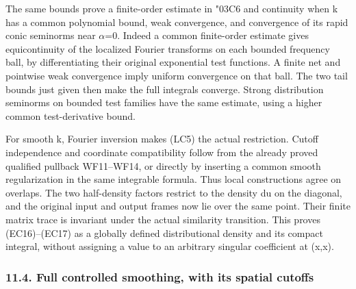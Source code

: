 \documentclass[
  11pt,
]{article}
\begin{document}
The same bounds prove a finite-order estimate in {\ReaderSymbols\char"03C6} and continuity when k
has a common polynomial bound, weak convergence, and convergence of its
rapid conic seminorms near \ensuremath{\alpha}=0. Indeed a common finite-order estimate
gives equicontinuity of the localized Fourier transforms on each bounded
frequency ball, by differentiating their original exponential test
functions. A finite net and pointwise weak convergence imply uniform
convergence on that ball. The two tail bounds just given then make the
full integrals converge. Strong distribution seminorms on bounded test
families have the same estimate, using a higher common test-derivative
bound.

For smooth k, Fourier inversion makes (LC5) the actual restriction.
Cutoff independence and coordinate compatibility follow from the already
proved qualified pullback WF11--WF14, or directly by inserting a common
smooth regularization in the same integrable formula. Thus local
constructions agree on overlaps. The two half-density factors restrict
to the density \textbar du\textbar{} on the diagonal, and the original
input and output frames now lie over the same point. Their finite matrix
trace is invariant under the actual similarity transition. This proves
(EC16)--(EC17) as a globally defined distributional density and its
compact integral, without assigning a value to an arbitrary singular
coefficient at (x,x).

\subsubsection{11.4. Full controlled smoothing, with its spatial
cutoffs}\label{full-controlled-smoothing-with-its-spatial-cutoffs}
\end{document}
